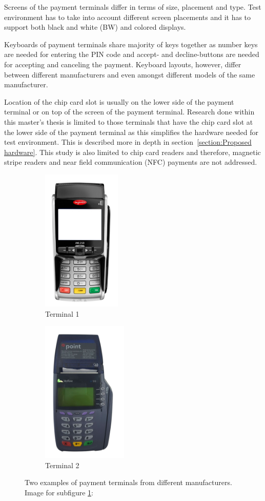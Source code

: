 Screens of the payment terminals differ in terms of size, placement and type. Test environment has to take into account different screen placements and it has to support both black and white (BW) and colored displays.

Keyboards of payment terminals share majority of keys together as number keys are needed for entering the PIN code and accept- and decline-buttons are needed for accepting and canceling the payment. Keyboard layouts, however, differ between different manufacturers and even amongst different models of the same manufacturer.

Location of the chip card slot is usually on the lower side of the payment terminal or on top of the screen of the payment terminal. Research done within this master's thesis is limited to those terminals that have the chip card slot at the lower side of the payment terminal as this simplifies the hardware needed for test environment. This is described more in depth in section~\ref{section:Proposed hardware}. This study is also limited to chip card readers and therefore, magnetic stripe readers and near field communication (NFC) payments are not addressed.

\begin{figure}
\centering
\begin{subfigure}{0.5\textwidth}
  \centering
  \includegraphics[height=6.8cm]{images/terminal1_1.png}
  \caption{Terminal 1}
  \label{fig:sub1}
\end{subfigure}%
\begin{subfigure}{0.5\textwidth}
  \centering
  \includegraphics[height=6.8cm]{images/terminal1_2.png}
  \caption{Terminal 2}
  \label{fig:sub2}
\end{subfigure}
\caption{Two examples of payment terminals from different manufacturers. Image for subfigure \ref{fig:sub1}: \citep{image1}}
\label{fig:terminals}
\end{figure}

